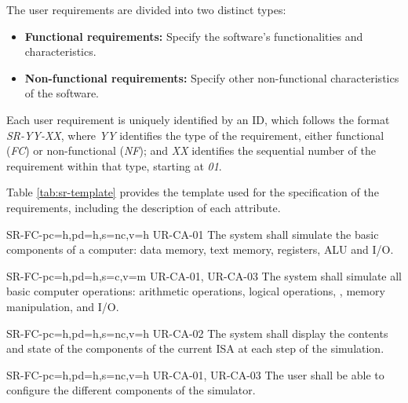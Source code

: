 The user requirements are divided into two distinct types:
\begin{itemize}
  \item \textbf{Functional requirements:} Specify the software's functionalities and characteristics.
  \item \textbf{Non-functional requirements:} Specify other non-functional characteristics of the software.
\end{itemize}

Each user requirement is uniquely identified by an ID, which follows the format \textit{SR-YY-XX}, where \textit{YY} identifies the type of the requirement, either functional (\textit{FC}) or non-functional (\textit{NF}); and \textit{XX} identifies the sequential number of the requirement within that type, starting at \textit{01}.

Table \ref{tab:sr-template} provides the template used for the specification of the requirements, including the description of each attribute.



\setcounter{i}{1}

\begin{softwareReq}{SR-FC-}{pc=h,pd=h,s=nc,v=h}
  {UR-CA-01}
  The system shall simulate the basic components of a computer: \gls{data memory}, \gls{text memory}, \glspl{register}, \gls{ALU} and \gls{I/O}.
\end{softwareReq}

\begin{softwareReq}{SR-FC-}{pc=h,pd=h,s=c,v=m}
  {UR-CA-01, UR-CA-03}
  The system shall simulate all basic computer operations: \glspl{arithmetic operation}, \glspl{logical operation}, , \gls{memory} manipulation, and \gls{I/O}.
\end{softwareReq}

\begin{softwareReq}{SR-FC-}{pc=h,pd=h,s=nc,v=h}
  {UR-CA-02}
  The system shall display the contents and state of the components of the current \gls{ISA} at each step of the simulation.
\end{softwareReq}

\begin{softwareReq}{SR-FC-}{pc=h,pd=h,s=nc,v=h}
  {UR-CA-01, UR-CA-03}
  The user shall be able to configure the different components of the simulator.
\end{softwareReq}

